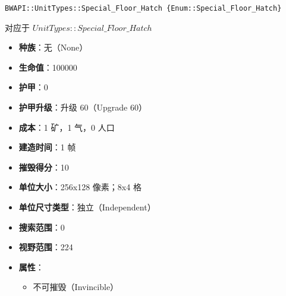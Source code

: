 \begin{tcolorbox}[colback=white, colframe=black!60!white, title=Special\_Floor\_Hatch(), arc=0mm]
    \begin{verbatim}
BWAPI::UnitTypes::Special_Floor_Hatch {Enum::Special_Floor_Hatch}
    \end{verbatim}
    对应于  $UnitTypes::Special\_Floor\_Hatch$ 
    \begin{itemize}
        \item \textbf{种族}：无（None）
        \item \textbf{生命值}：100000
        \item \textbf{护甲}：0
        \item \textbf{护甲升级}：升级 60（Upgrade 60）
        \item \textbf{成本}：1 矿，1 气，0 人口
        \item \textbf{建造时间}：1 帧
        \item \textbf{摧毁得分}：10
        \item \textbf{单位大小}：256x128 像素；8x4 格
        \item \textbf{单位尺寸类型}：独立（Independent）
        \item \textbf{搜索范围}：0
        \item \textbf{视野范围}：224
        \item \textbf{属性}：
            \begin{itemize}
                \item 不可摧毁（Invincible）
            \end{itemize}
    \end{itemize}
\end{tcolorbox}

